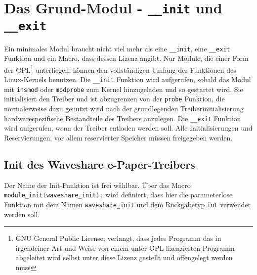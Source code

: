 
\section{Das Grund-Modul - \texttt{__init} und \texttt{__exit}}
Ein minimales Modul braucht nicht viel mehr als eine \texttt{__init}, eine \texttt{__exit} Funktion und ein Macro, dass dessen Lizenz angibt. Nur Module, die einer Form der GPL\footnote{GNU General Public License; verlangt, dass jedes Programm das in irgendeiner Art und Weise von einem unter GPL lizenzierten Programm abgeleitet wird selbst unter diese Lizenz gestellt und offengelegt werden muss} unterliegen, können den vollständigen Umfang der Funktionen des Linux-Kernels benutzen. %
Die \texttt{__init} Funktion wird aufgerufen, sobald das Modul mit \texttt{insmod} oder \texttt{modprobe} zum Kernel hinzugeladen und so gestartet wird. Sie initialisiert den Treiber und ist abzugrenzen von der \texttt{probe} Funktion, die normalerweise dazu genutzt wird nach der grundlegenden Treiberinitialisierung hardwarespezifische Bestandteile des Treibers anzulegen. 
Die \texttt{__exit} Funktion wird aufgerufen, wenn der Treiber entladen werden soll. Alle Initialisierungen und Reservierungen, vor allem reservierter Speicher müssen freigegeben werden. 

\subsection{Init des Waveshare e-Paper-Treibers}
Der Name der Init-Funktion ist frei wählbar. Über das Macro \mintinline {c}{module_init(waveshare_init);} wird  definiert, dass hier die parameterlose Funktion mit dem Namen \texttt{waveshare\_init} und dem Rückgabetyp \texttt{int} verwendet werden soll. 

